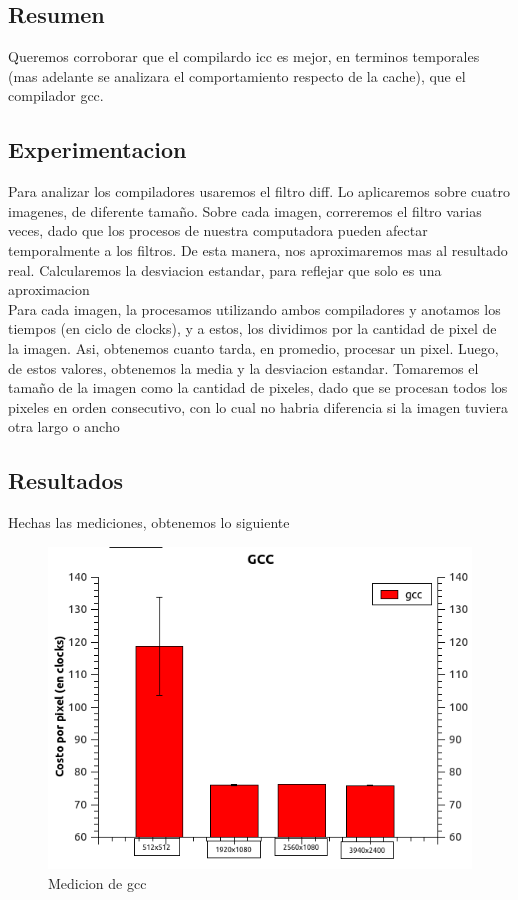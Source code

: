 \subsection{Resumen}
Queremos corroborar que el compilardo icc es mejor, en terminos temporales (mas adelante se analizara el comportamiento respecto de la cache), que el compilador gcc.

\subsection{Experimentacion}
Para analizar los compiladores usaremos el filtro diff. Lo aplicaremos sobre cuatro imagenes, de diferente tamaño. Sobre cada imagen, correremos el filtro varias veces, dado que los procesos de nuestra computadora pueden afectar temporalmente a los filtros. De esta manera, nos aproximaremos mas al resultado real. Calcularemos la desviacion estandar, para reflejar que solo es una aproximacion \\
Para cada imagen, la procesamos utilizando ambos compiladores y anotamos los tiempos (en ciclo de clocks), y a estos, los dividimos por la cantidad de pixel de la imagen. Asi, obtenemos cuanto tarda, en promedio, procesar un pixel. Luego, de estos valores, obtenemos la media y la desviacion estandar. Tomaremos el tamaño de la imagen como la cantidad de pixeles, dado que se procesan todos los pixeles en orden consecutivo, con lo cual no habria diferencia si la imagen tuviera otra largo o ancho

\subsection{Resultados}
Hechas las mediciones, obtenemos lo siguiente

\begin{figure}[H]
\begin{center}
  \includegraphics[width=\linewidth]{tiemposCompiladores/gcc.png}
  \caption{{\small Medicion de gcc}} 
\endminipage
\end{center}
\end{figure}

